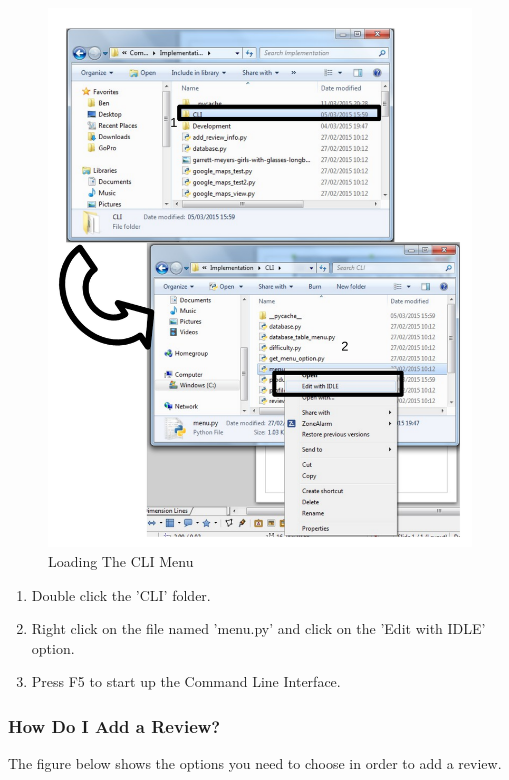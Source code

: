 \begin{figure}[H]
    \includegraphics[width=\textwidth]{./Manual/Images/LoadingCLI.pdf}
    \caption{Loading The CLI Menu} \label{fig:Loading CLI}
\end{figure}

\begin{enumerate}
\item Double click the 'CLI' folder.
\item Right click on the file named 'menu.py' and click on the 'Edit with IDLE' option.
\item Press F5 to start up the Command Line Interface.
\end{enumerate}

\subsubsection{How Do I Add a Review?}

The figure below shows the options you need to choose in order to add a review. 


